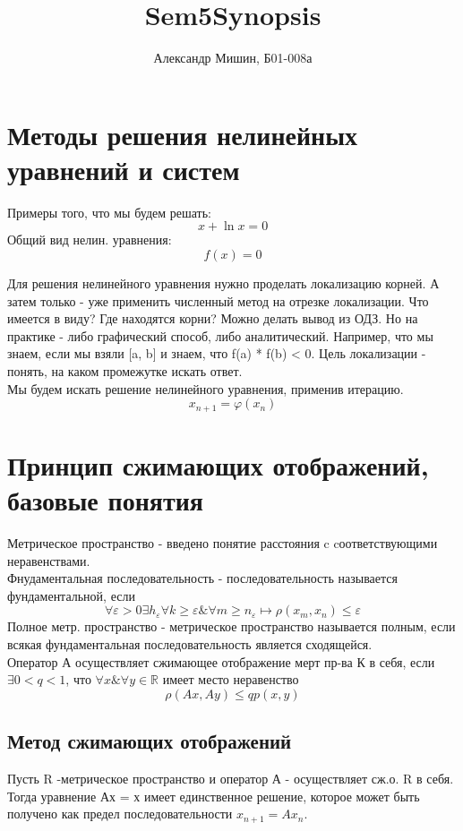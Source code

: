 \documentclass[a4paper,12pt]{article}
\title{Sem5Synopsis}
\author{Александр Мишин, Б01-008а}
\date{}
\newcommand\attention[1]{\colorbox{cyan!30}{#1}}
\begin{document}
\maketitle

\section{Методы решения нелинейных уравнений и систем}

Примеры того, что мы будем решать:
\[ x + \ln{x} = 0\]
Общий вид нелин. уравнения:
\[f(x) = 0\]

Для решения нелинейного уравнения нужно проделать локализацию корней. А затем только - уже применить численный метод на отрезке локализации. Что имеется в виду? Где находятся корни? Можно делать вывод из ОДЗ. Но на практике - либо графический способ, либо аналитический. Например, что мы знаем, если мы взяли [a, b] и знаем, что f(a) * f(b) < 0. \attention{Цель локализации - понять, на каком промежутке искать ответ.}\\

Мы будем искать решение нелинейного уравнения, применив итерацию.
\[x_{n+1} = \varphi(x_n)\]

\section{Принцип сжимающих отображений, базовые понятия}

\attention{Метрическое пространство} - введено понятие расстояния c cоответствующими неравенствами.\\
\attention{Фнудаментальная последовательность} - последовательность называется фундаментальной, если 
\[\forall \varepsilon > 0  \exists h_\varepsilon \forall k \geq \varepsilon \& \forall m \geq n_\varepsilon \longmapsto \rho(x_m, x_n) \leq \varepsilon\]
\attention{Полное метр. пространство} - метрическое пространство называется полным, если всякая фундаментальная последовательность является сходящейся.\\
Оператор А осуществляет \attention{сжимающее отображение} мерт пр-ва К в себя, если $\exists 0 < q < 1$, что $\forall x \& \forall y \in \mathds{R}$ имеет место неравенство 
\[\rho (Ax, Ay) \leq qp(x,y)\]

\subsection*{Метод сжимающих отображений}
    Пусть R -метрическое пространство и оператор А  - осуществляет сж.о. R в себя. Тогда уравнение Ах = х имеет единственное решение, которое может быть получено как предел последовательности $x_{n+1} = Ax_n$.
\end{document}
